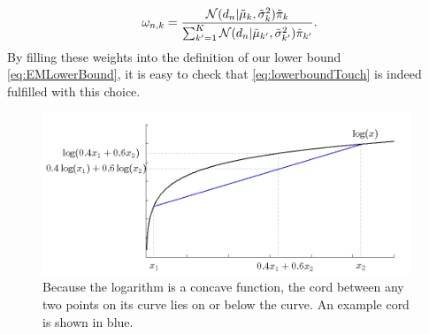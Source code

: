 \documentclass[10pt,twoside]{book}
\begin{document}
\begin{equation}
  \omega_{n,k} =  \frac{ \N( d_n | \tilde{\mu}_k, \tilde{\sigma}_k^2 ) \tilde{\pi}_k }%
                { \sum_{k'=1}^K \N( d_n | \tilde{\mu}_{k'}, \tilde{\sigma}_{k'}^2 ) \tilde{\pi}_{k'} }.
  \label{eq:EMWeights}
\end{equation}
By filling these weights into the definition of our lower bound \eqref{eq:EMLowerBound}, it is easy to check that \eqref{eq:lowerboundTouch} is indeed fulfilled with this choice.

\begin{figure}
  \centering
  \includegraphics[width=0.98\textwidth]{Jensen}
  \caption{Because the logarithm is a concave function, the cord between any two points on its curve lies on or below the curve. An example cord is shown in blue.}
  \label{fig:logConcave}
\end{figure}
\end{document}
